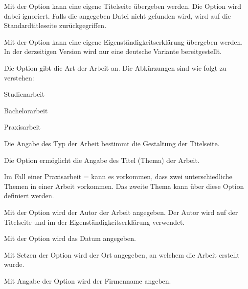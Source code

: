 \documentclass[babel=ngerman,highlight=false]{skdoc}
\begin{document}
            Mit der Option kann eine eigene Titelseite übergeben werden. Die Option  wird dabei ignoriert. Falls die angegeben Datei nicht gefunden wird, wird auf die Standardtitleseite zurückgegriffen.\medskip
            
            Mit der Option kann eine eigene Eigenständigkeitserklärung übergeben werden. In der derzeitigen Version wird nur eine deutsche Variante bereitgestellt.\medskip
            
            Die Option gibt die Art der Arbeit an. Die Abkürzungen sind wie folgt zu verstehen:
            \begin{description}[noitemsep,style=multiline,leftmargin=1cm]
                \item[SA] Studienarbeit
                \item[BA] Bachelorarbeit
                \item[PA] Praxisarbeit
            \end{description}
            Die Angabe des Typ der Arbeit bestimmt die Gestaltung der Titelseite.\medskip
            
            Die Option ermöglicht die Angabe des Titel (Thema) der Arbeit.\medskip
            
            Im Fall einer Praxisarbeit  =  kann es vorkommen, dass zwei unterschiedliche Themen in einer Arbeit vorkommen. Das zweite Thema kann über diese Option definiert werden.\medskip
            
            Mit der Option wird der Autor der Arbeit angegeben. Der Autor wird auf der Titelseite und im der Eigenständigkeitserklärung verwendet.\medskip
            
            Mit der Option wird das Datum angegeben.\medskip
            
            Mit Setzen der Option wird der Ort angegeben, an welchem die Arbeit erstellt wurde.\medskip
            
            Mit Angabe der Option wird der Firmenname angeben.\medskip
            
\end{document}

